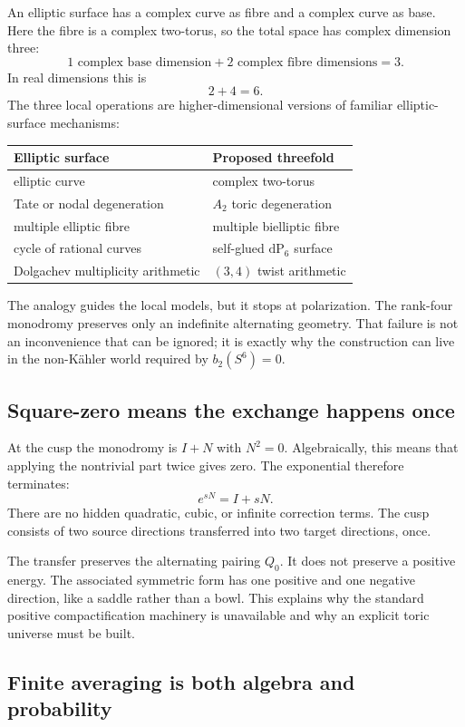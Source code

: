 \documentclass[11pt,reqno]{amsart}
\numberwithin{equation}{section}
\newcommand{\dP}{\mathrm{dP}_6}
\theoremstyle{definition}
\begin{document}
An elliptic surface has a complex curve as fibre and a complex curve as base. Here the fibre is a complex two-torus, so the total space has complex dimension three:
\[
1\text{ complex base dimension}+2\text{ complex fibre dimensions}=3.
\]
In real dimensions this is
\[
2+4=6.
\]
The three local operations are higher-dimensional versions of familiar elliptic-surface mechanisms:
\begin{center}
\begin{tabular}{@{}ll@{}}
\toprule
Elliptic surface & Proposed threefold\\
\midrule
elliptic curve & complex two-torus\\
Tate or nodal degeneration & $A_2$ toric degeneration\\
multiple elliptic fibre & multiple bielliptic fibre\\
cycle of rational curves & self-glued $\dP$ surface\\
Dolgachev multiplicity arithmetic & $(3,4)$ twist arithmetic\\
\bottomrule
\end{tabular}
\end{center}
The analogy guides the local models, but it stops at polarization. The rank-four monodromy preserves only an indefinite alternating geometry. That failure is not an inconvenience that can be ignored; it is exactly why the construction can live in the non-K\"ahler world required by $b_2(S^6)=0$.

\subsection{Square-zero means the exchange happens once}

At the cusp the monodromy is $I+N$ with $N^2=0$. Algebraically, this means that applying the nontrivial part twice gives zero. The exponential therefore terminates:
\[
e^{sN}=I+sN.
\]
There are no hidden quadratic, cubic, or infinite correction terms. The cusp consists of two source directions transferred into two target directions, once.

The transfer preserves the alternating pairing $Q_0$. It does not preserve a positive energy. The associated symmetric form has one positive and one negative direction, like a saddle rather than a bowl. This explains why the standard positive compactification machinery is unavailable and why an explicit toric universe must be built.

\subsection{Finite averaging is both algebra and probability}
\end{document}
